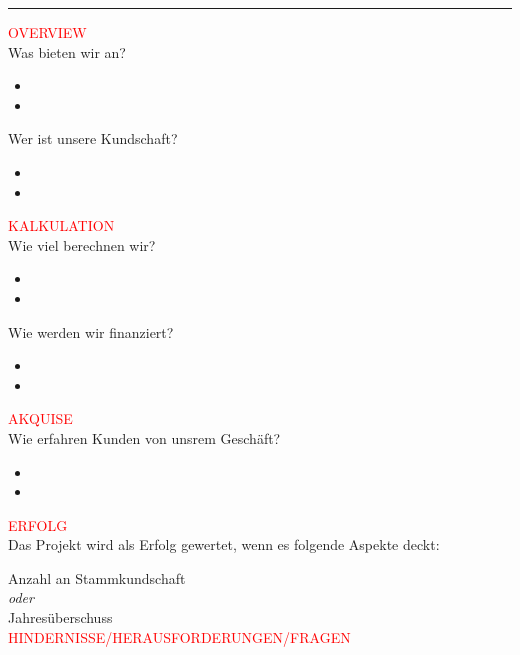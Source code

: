 \documentclass[12pt]{scrartcl} %
\begin{document}
\noindent\rule{\textwidth}{1pt}

\vspace{2cm}

\begin{paracol}{2}

\textcolor{red}{OVERVIEW} \\
\small Was bieten wir an? \normalsize \\
\begin{itemize}
    \item
    \item
\end{itemize}

\vspace{1cm}

\small Wer ist unsere Kundschaft? \normalsize \\
\begin{itemize}
    \item
    \item
\end{itemize}

\vspace{1cm}

\textcolor{red}{KALKULATION} \\
\small Wie viel berechnen wir? \normalsize \\
\begin{itemize}
    \item
    \item
\end{itemize}

\vspace{1cm}
\small Wie werden wir finanziert? \normalsize \\
\begin{itemize}
    \item
    \item
\end{itemize}


\switchcolumn

\textcolor{red}{AKQUISE} \\
\small Wie erfahren Kunden von unsrem Geschäft? \normalsize \\
\begin{itemize}
    \item
    \item
\end{itemize}
\vspace{1cm}

\textcolor{red}{ERFOLG} \\
\small Das Projekt wird als Erfolg gewertet, wenn es folgende Aspekte deckt: \normalsize

\vspace{0.5cm}
\small Anzahl an Stammkundschaft \normalsize \\

\small\textit{oder} \\

\small Jahresüberschuss \normalsize \\

\vspace{2cm}
\textcolor{red}{HINDERNISSE/HERAUSFORDERUNGEN/FRAGEN} \\
\end{paracol}
\end{document}
